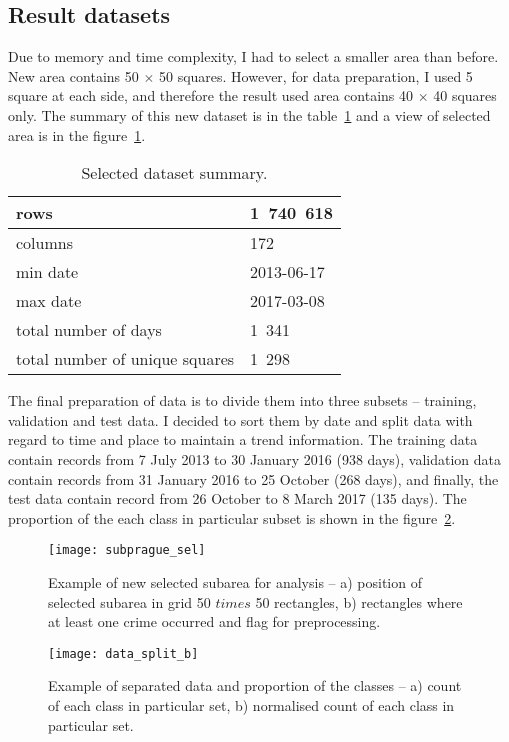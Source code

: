 \documentclass[thesis=M,english]{FITthesis}[2012/10/20]
\begin{document}
\subsection{Result datasets}\label{sec:result_datasets}

Due to memory and time complexity, I had to select a smaller area than before. New area contains 50 $\times$ 50 squares. However, for data preparation, I used 5 square at each side, and therefore the result used area contains 40 $\times$ 40 squares only. The summary of this new dataset is in the table~\ref{tab:fdataset_summary} and a view of selected area is in the figure~\ref{fig:subprague}.

\begin{table}[H]\centering
\begin{small}
    \caption{Selected dataset summary.}\label{tab:fdataset_summary}
    \begin{tabular}{|l|l|}\hline
        rows &  1~740~618\tabularnewline \hline
        columns & 172 \tabularnewline \hline
        min date & 2013-06-17 \tabularnewline \hline
        max date & 2017-03-08 \tabularnewline \hline
        total number of days & 1~341 \tabularnewline \hline
        total number of unique squares & 1~298 \tabularnewline \hline
    \end{tabular}
\end{small}
\end{table}

The final preparation of data is to divide them into three subsets -- training, validation and test data. I decided to sort them by date and split data with regard to time and place to maintain a trend information. The training data contain records from 7 July 2013 to 30 January 2016 (938 days), validation data contain records from 31 January 2016 to 25 October (268 days), and finally, the test data contain record from 26 October to 8 March 2017 (135 days). The proportion of the each class in particular subset is shown in the figure~\ref{fig:data_split}. 

\begin{figure}[ht]\centering
    \texttt{[image: subprague\_sel]}\label{fig:subprague}
    \caption{Example of new selected subarea for analysis -- a) position of selected subarea in grid 50 $times$ 50 rectangles, b) rectangles where at least one crime occurred and flag for preprocessing.}
\end{figure}

\begin{figure}[ht]\centering
    \texttt{[image: data\_split\_b]}\label{fig:data_split}
    \caption{Example of separated data and proportion of the classes -- a) count of each class in particular set, b) normalised count of each class in particular set.}
\end{figure}
\end{document}
